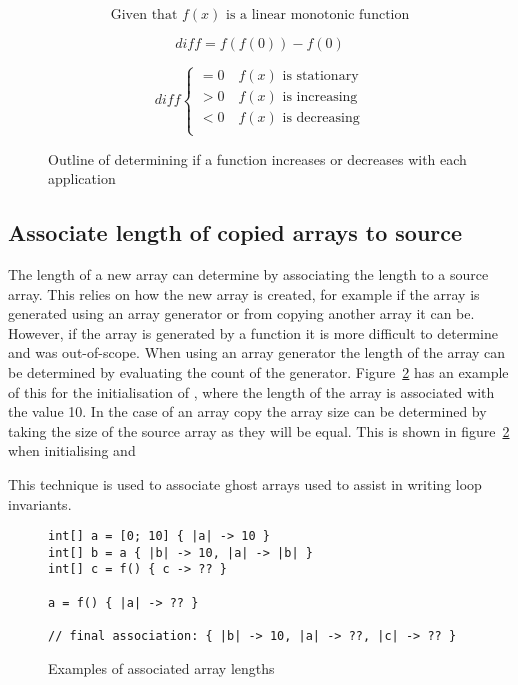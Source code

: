 \begin{figure}
    $$\text{Given that } f(x) \text{ is a linear monotonic function}$$

    $$diff = f(f(0)) - f(0)$$

    \[
        diff \begin{cases}
            = 0 \quad f(x) \text{ is stationary}\\
            > 0 \quad f(x) \text{ is increasing}\\
            < 0 \quad f(x) \text{ is decreasing}\\
        \end{cases}
    \]
    \caption{Outline of determining if a function increases or decreases with
    each application}
\label{math:simple-mutation}
\end{figure}


\subsection{Associate length of copied arrays to source}\label{s:copied-array}

The length of a new array can determine by associating the length to a source
array.
This relies on how the new array is created, for example if the array is
generated using an array generator or from copying another array it can be.
However, if the array is generated by a function it is more difficult to
determine and was out-of-scope.
When using an array generator the length of the array can be determined by
evaluating the count of the generator.
Figure~\ref{lst:simple-mutations} has an example of this for the initialisation
of , where the length of the array is associated with the value 10.
In the case of an array copy the array size can be determined by taking the
size of the source array as they will be equal.
This is shown in figure~\ref{lst:simple-mutations} when initialising 
and 

This technique is used to associate ghost arrays used to assist in writing
loop invariants.

\begin{figure}[ht]
\begin{lstlisting}
int[] a = [0; 10] { |a| -> 10 }
int[] b = a { |b| -> 10, |a| -> |b| }
int[] c = f() { c -> ?? }

a = f() { |a| -> ?? }

// final association: { |b| -> 10, |a| -> ??, |c| -> ?? }
\end{lstlisting}
\caption{Examples of associated array lengths}
\label{lst:simple-mutations}
\end{figure}
